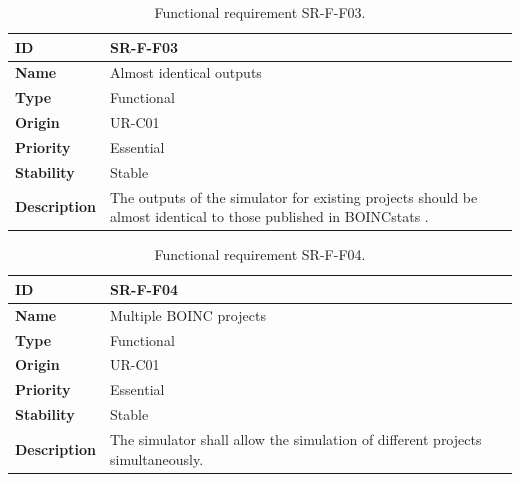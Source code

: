 \begin{center}
\begin{table}[htbp]
\centering
\begin{tabular}{@{}p{2.5cm} p{9cm}@{}} 
\toprule
\textbf{ID} 				& SR-F-F03\\
\midrule
\textbf{Name} 			& Almost identical outputs \\
\midrule
\textbf{Type} 			& Functional \\
\midrule
\textbf{Origin} 			& UR-C01 \\
\midrule
\textbf{Priority}		& Essential \\
\midrule
\textbf{Stability} 		& Stable \\
\midrule
\textbf{Description} 	& The outputs of the simulator for existing projects should be almost identical to those published in BOINCstats \cite{BOINC2016}. \\
\bottomrule
\end{tabular}
\caption{Functional requirement SR-F-F03.}
\label{tab:srff03}
\end{table}
\end{center}

\begin{center}
\begin{table}[htbp]
\centering
\begin{tabular}{@{}p{2.5cm} p{9cm}@{}} 
\toprule
\textbf{ID} 				& SR-F-F04\\
\midrule
\textbf{Name} 			& Multiple BOINC projects \\
\midrule
\textbf{Type} 			& Functional \\
\midrule
\textbf{Origin} 			& UR-C01 \\
\midrule
\textbf{Priority}		& Essential \\
\midrule
\textbf{Stability} 		& Stable \\
\midrule
\textbf{Description} 	& The simulator shall allow the simulation of different projects simultaneously. \\
\bottomrule
\end{tabular}
\caption{Functional requirement SR-F-F04.}
\label{tab:srff04}
\end{table}
\end{center}

